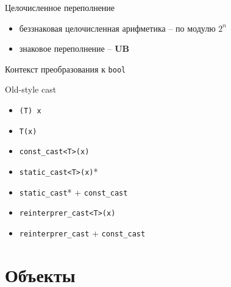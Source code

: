 \documentclass[unknownkeysallowed,xcolor=table]{beamer}
\begin{document}
\begin{frame}{Целочисленное переполнение}
  \begin{itemize}
    \item беззнаковая целочисленная арифметика -- по модулю $2^n$ \vspace{2em}
    \item знаковое переполнение -- \textbf{UB}
  \end{itemize}
\end{frame}

\begin{frame}{Контекст преобразования к \lstinline{bool}}
\end{frame}

\begin{frame}[fragile]{Old-style cast}
  \begin{minipage}{.45\textwidth}
    \begin{itemize}
      \item \lstinline{(T) x}
      \item \lstinline{T(x)}
    \end{itemize}
  \end{minipage}\hfill
  \begin{minipage}{.45\textwidth}
    \begin{itemize}
      \item \lstinline{const_cast<T>(x)} \vspace{0.5em}
      \item \lstinline{static_cast<T>(x)}* \vspace{0.5em}
      \item \lstinline{static_cast}* + \lstinline{const_cast} \vspace{0.5em}
      \item \lstinline{reinterprer_cast<T>(x)}
      \item \lstinline{reinterprer_cast} + \lstinline{const_cast}
    \end{itemize}
  \end{minipage}
\end{frame}

\section{Объекты}
\end{document}
